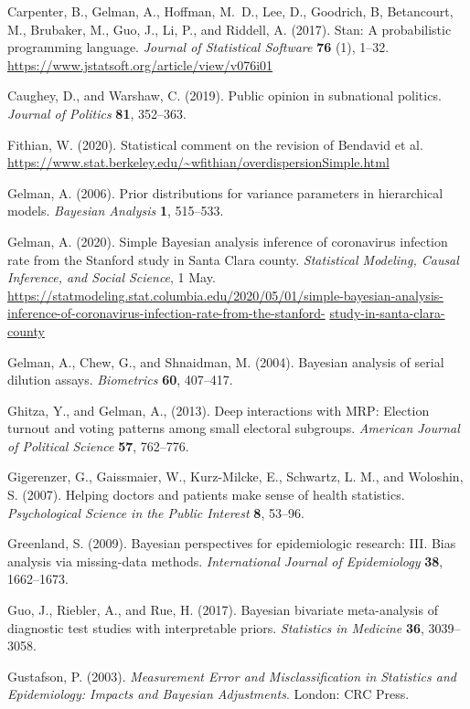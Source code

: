 \documentclass[11pt]{article}
\begin{document}
\bibitem Carpenter, B., Gelman, A., Hoffman, M.~D., Lee, D., Goodrich,
  B, Betancourt, M., Brubaker, M., Guo, J., Li, P., and Riddell, A.
  (2017). Stan: A probabilistic programming language. {\em Journal of
    Statistical Software} {\bf 76} (1), 1--32. {\small
    \url{https://www.jstatsoft.org/article/view/v076i01}}

\bibitem Caughey, D., and Warshaw, C. (2019).  Public opinion in
  subnational politics.  {\em Journal of Politics} {\bf 81}, 352--363.

\bibitem Fithian, W. (2020).  Statistical comment on the revision of
  Bendavid et al. {\small
    \url{https://www.stat.berkeley.edu/~wfithian/overdispersionSimple.html}}

\bibitem Gelman, A. (2006). Prior distributions for variance
  parameters in hierarchical models. {\em Bayesian Analysis} {\bf 1},
  515--533.
  
\bibitem Gelman, A. (2020).  Simple Bayesian analysis inference of
  coronavirus infection rate from the Stanford study in Santa Clara
  county. {\em Statistical Modeling, Causal Inference, and Social
    Science}, 1 May.  {\small
    \url{https://statmodeling.stat.columbia.edu/2020/05/01/simple-bayesian-analysis-inference-of-coronavirus-infection-rate-from-the-stanford-}} {\small \url{study-in-santa-clara-county}}

  
\bibitem Gelman, A., Chew, G., and Shnaidman, M. (2004).  Bayesian
  analysis of serial dilution assays. {\em Biometrics} {\bf 60},
  407--417.

\bibitem Ghitza, Y., and Gelman, A., (2013). Deep interactions with
  MRP: Election turnout and voting patterns among small electoral
  subgroups. {\em American Journal of Political Science} {\bf 57},
  762--776.

\bibitem Gigerenzer, G., Gaissmaier, W., Kurz-Milcke, E., Schwartz,
  L. M., and Woloshin, S.  (2007).  Helping doctors and patients make
  sense of health statistics.  {\em Psychological Science in the
    Public Interest} {\bf 8}, 53--96.

\bibitem Greenland, S. (2009).  Bayesian perspectives for
  epidemiologic research: III. Bias analysis via missing-data methods.
  {\em International Journal of Epidemiology} {\bf 38}, 1662--1673.

\bibitem Guo, J., Riebler, A., and Rue, H. (2017).  Bayesian bivariate
  meta-analysis of diagnostic test studies with interpretable priors.
  {\em Statistics in Medicine} {\bf 36}, 3039--3058.

\bibitem Gustafson, P. (2003).  {\em Measurement Error and
    Misclassification in Statistics and Epidemiology: Impacts and
    Bayesian Adjustments}.  London: CRC Press.
\end{document}
